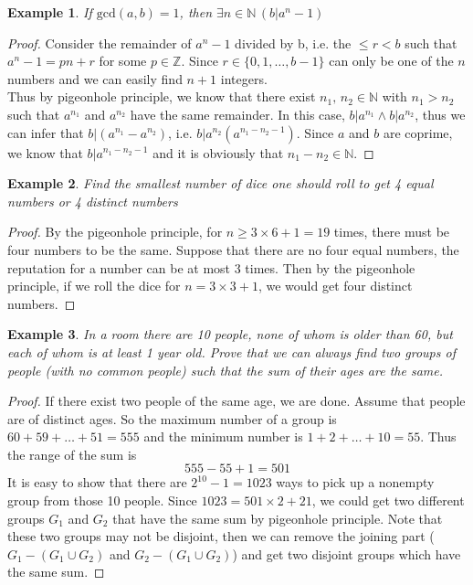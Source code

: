\documentclass{article}
\newtheorem{example}{Example}[section]
\begin{document}
    \begin{example}
        If $\text{gcd}(a,b)=1$, then $\exists n\in\mathbb{N}\,(b|a^n-1)$
    \end{example}
    \begin{proof}
        Consider the remainder of $a^n-1$ divided by b, i.e. the $\leq r<b$ such that $a^n-1=pn+r$ for some $p\in\mathbb{Z}$. Since $r\in\{0,1,\ldots,b-1\}$ can only be one of the $n$ numbers and we can easily find $n+1$ integers.\\
        
        Thus by pigeonhole principle, we know that there exist $n_1,\,n_2\in\mathbb{N}$ with $n_1>n_2$ such that $a^{n_1}$ and $a^{n_2}$ have the same remainder. In this case, $b|a^{n_1}\wedge b|a^{n_2}$, thus we can infer that $b|(a^{n_1}-a^{n_2})$, i.e. $b|a^{n_2}(a^{n_1-n_2-1})$. Since $a$ and $b$ are coprime, we know that $b|a^{n_1-n_2-1}$ and it is obviously that $n_1-n_2\in\mathbb{N}$.
    \end{proof}
    \newpage
    \begin{example}
        Find the smallest number of dice one should roll to get 4 equal numbers or 4 distinct numbers
    \end{example}
    \begin{proof}
        By the pigeonhole principle, for $n\geq3\times6+1=19$ times, there must be four numbers to be the same. Suppose that there are no four equal numbers, the reputation for a number can be at most 3 times. Then by the pigeonhole principle, if we roll the dice for $n=3\times3+1$, we would get four distinct numbers.
    \end{proof}

    \begin{example}
        In a room there are 10 people, none of whom is older than 60, but each of whom is at least 1 year old. Prove that we can always find two groups of people (with no common people) such that the sum of their ages are the same.
    \end{example}

    \begin{proof}
        If there exist two people of the same age, we are done. Assume that people are of distinct ages. So the maximum number of a group is $60+59+\ldots+51=555$ and the minimum number is $1+2+\ldots+10=55$. Thus the range of the sum is
        \begin{equation*}
            555-55+1=501
        \end{equation*}
        It is easy to show that there are $2^10-1=1023$ ways to pick up a nonempty group from those 10 people. Since $1023=501\times2+21$, we could get two different groups $G_1$ and $G_2$ that have the same sum by pigeonhole principle. Note that these two groups may not be disjoint, then we can remove the joining part ($G_1-(G_1\cup G_2)$ and $G_2-(G_1\cup G_2)$) and get two disjoint groups which have the same sum.
    \end{proof}
\end{document}
